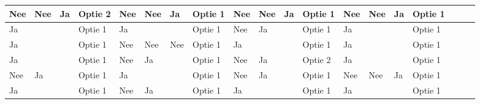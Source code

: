 \documentclass[twoside,openright]{uva-bachelor-thesis}
\begin{document}
\begin{table}
\begin{tabular}{|l|l|l|l|l|l|l|l|l|l|l|l|l|l|l|l|l|l|l|}
		Nee      & Nee      & Ja       & Optie 2                             & Nee      & Nee      & Ja       & Optie 1                             & Nee      & Nee      & Ja       & Optie 1                             & Nee      & Nee      & Ja       & Optie 1                             &                    &                    &                                                          \\  \hline
		Ja       &          &          & Optie 1                             & Ja       &          &          & Optie 1                             & Nee      & Ja       &          & Optie 1                             & Ja       &          &          & Optie 1                             &                    &                    &                                                         \\  \hline
		Ja       &          &          & Optie 1                             & Nee      & Nee      & Nee      & Optie 1                             & Ja       &          &          & Optie 1                             & Ja       &          &          & Optie 1                             &                    &                    &                                                          \\  \hline
		Ja       &          &          & Optie 1                             & Nee      & Ja       &          & Optie 1                             & Nee      & Ja       &          & Optie 2                             & Ja       &          &          & Optie 1                             &                    &                    &                                                         \\  \hline
		Nee      & Ja       &          & Optie 1                             & Ja       &          &          & Optie 1                             & Nee      & Ja       &          & Optie 1                             & Nee      & Nee      & Ja       & Optie 1                             &                    &                    &                                                          \\  \hline
		Ja       &          &          & Optie 1                             & Nee      & Ja       &          & Optie 1                             & Ja       &          &          & Optie 1                             & Ja       &          &          & Optie 1                             &                    &                    &                                                          \\  \hline

\end{tabular}
\end{table}
\end{document}
